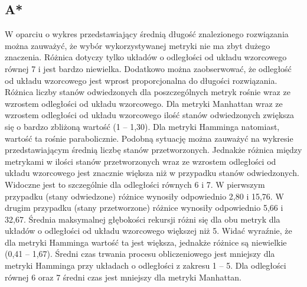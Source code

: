 \documentclass{classrep}
\begin{document}
\subsection{A*}
{\color{black}
W oparciu o wykres przedstawiający średnią długość znalezionego rozwiązania można zauważyć, że wybór wykorzystywanej metryki nie ma zbyt dużego znaczenia. Różnica dotyczy tylko układów 
o odległości od układu wzorcowego równej 7 i jest bardzo niewielka. Dodatkowo można zaobserwować, że odległość od układu wzorcowego jest wprost proporcjonalna do długości rozwiązania. Różnica liczby stanów odwiedzonych dla poszczególnych metryk rośnie wraz ze wzrostem odległości od układu wzorcowego. Dla metryki Manhattan wraz ze wzrostem odległości od układu wzorcowego ilość stanów odwiedzonych zwiększa się o bardzo zbliżoną wartość (1 – 1,30). Dla metryki Hamminga natomiast, wartość ta rośnie parabolicznie. Podobną sytuację można zauważyć na wykresie przedstawiającym średnią liczbę stanów przetworzonych. Jednakże różnica między metrykami w ilości stanów przetworzonych wraz ze wzrostem odległości od układu wzorcowego jest znacznie większa niż w przypadku stanów odwiedzonych. Widoczne jest to szczególnie dla odległości równych 6 i 7. W pierwszym przypadku (stany odwiedzone) różnice wynosiły odpowiednio 2,80 i 15,76. W drugim przypadku (stany przetworzone) różnice wynosiły odpowiednio 5,66 i 32,67. Średnia maksymalnej głębokości rekursji różni się dla obu metryk dla układów o odległości od układu wzorcowego większej niż 5. Widać wyraźnie, że dla metryki Hamminga wartość ta jest większa, jednakże różnice są niewielkie (0,41 – 1,67). Średni czas trwania procesu obliczeniowego jest mniejszy dla metryki Hamminga przy układach o odległości z zakresu 1 – 5. Dla odległości równej 6 oraz 7 średni czas jest mniejszy dla metryki Manhattan.}
\end{document}
